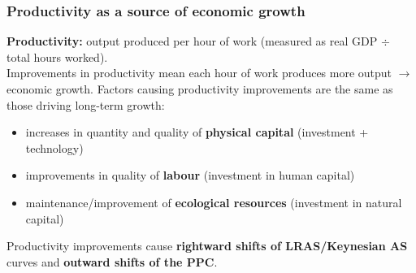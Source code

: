 \documentclass[a4paper,12pt]{article}
\begin{document}
\subsubsection*{Productivity as a source of economic growth}
\textbf{Productivity:} output produced per hour of work (measured as real GDP $\div$ total hours worked). \\Improvements in productivity mean each hour of work produces more output $\to$ economic growth. Factors causing productivity improvements are the same as those driving long-term growth:
\begin{itemize}
  \item increases in quantity and quality of \textbf{physical capital} (investment + technology)
  \item improvements in quality of \textbf{labour} (investment in human capital)
  \item maintenance/improvement of \textbf{ecological resources} (investment in natural capital)
\end{itemize}
Productivity improvements cause \textbf{rightward shifts of LRAS/Keynesian AS} curves and \textbf{outward shifts of the PPC}.
\end{document}
